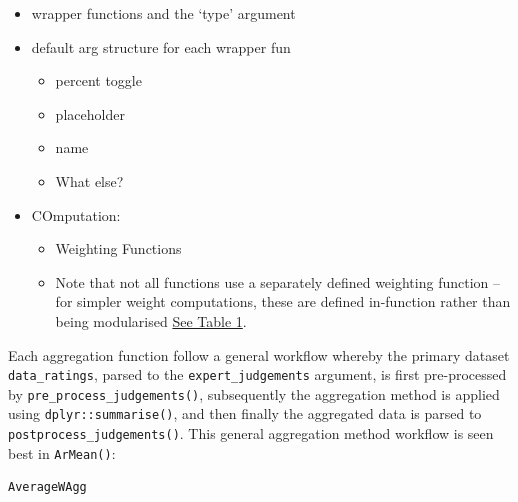 \documentclass[article]{jss}
\begin{document}
\begin{tcolorbox}[enhanced jigsaw, colback=white, toprule=.15mm, colframe=quarto-callout-color-frame, arc=.35mm, rightrule=.15mm, bottomrule=.15mm, breakable, leftrule=.75mm, left=2mm, opacityback=0]

\begin{itemize}
\item
  wrapper functions and the `type' argument
\item
  default arg structure for each wrapper fun

  \begin{itemize}
  \item
    percent toggle
  \item
    placeholder
  \item
    name
  \item
    What else?
  \end{itemize}
\item
  COmputation:

  \begin{itemize}
  \item
    Weighting Functions
  \item
    Note that not all functions use a separately defined weighting
    function -- for simpler weight computations, these are defined
    in-function rather than being modularised
    \protect\hyperlink{table1}{See Table 1}.
  \end{itemize}
\end{itemize}

Each aggregation function follow a general workflow whereby the primary
dataset \texttt{data\_ratings}, parsed to the
\texttt{expert\_judgements} argument, is first pre-processed by
\texttt{pre\_process\_judgements()}, subsequently the aggregation method
is applied using \texttt{dplyr::summarise()}, and then finally the
aggregated data is parsed to \texttt{postprocess\_judgements()}. This
general aggregation method workflow is seen best in \texttt{ArMean()}:

\begin{verbatim}
AverageWAgg
\end{verbatim}


\end{tcolorbox}
\end{document}
